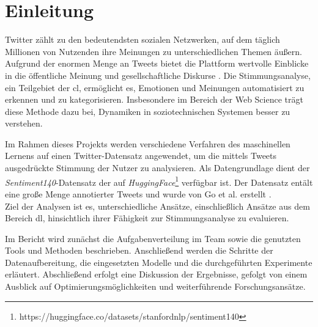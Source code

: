 \section{Einleitung}

Twitter zählt zu den bedeutendsten sozialen Netzwerken, auf dem täglich Millionen von Nutzenden ihre Meinungen zu unterschiedlichen Themen äußern.
Aufgrund der enormen Menge an Tweets bietet die Plattform wertvolle Einblicke in die öffentliche Meinung und gesellschaftliche Diskurse \cite{pak2010twitter}.
Die Stimmungsanalyse, ein Teilgebiet der \gls{cl}, ermöglicht es, Emotionen und Meinungen automatisiert zu erkennen und zu kategorisieren.
Insbesondere im Bereich der Web Science trägt diese Methode dazu bei, Dynamiken in soziotechnischen Systemen besser zu verstehen.

Im Rahmen dieses Projekts werden verschiedene Verfahren des maschinellen Lernens auf einen Twitter-Datensatz angewendet, um die mittels Tweets ausgedrückte Stimmung der Nutzer zu analysieren.
Als Datengrundlage dient der \textit{Sentiment140}-Datensatz der auf \textit{HuggingFace}\footnote{https://huggingface.co/datasets/stanfordnlp/sentiment140} verfügbar ist.
Der Datensatz entält eine große Menge annotierter Tweets und wurde von Go et al. erstellt \cite{go2009twitter}.\\
Ziel der Analysen ist es, unterschiedliche Ansätze, einschließlich Ansätze aus dem Bereich \gls{dl}, hinsichtlich ihrer Fähigkeit zur Stimmungsanalyse zu evaluieren.

Im Bericht wird zunächst die Aufgabenverteilung im Team sowie die genutzten Tools und Methoden beschrieben.
Anschließend werden die Schritte der Datenaufbereitung, die eingesetzten Modelle und die durchgeführten Experimente erläutert.
Abschließend erfolgt eine Diskussion der Ergebnisse, gefolgt von einem Ausblick auf Optimierungsmöglichkeiten und weiterführende Forschungsansätze.
